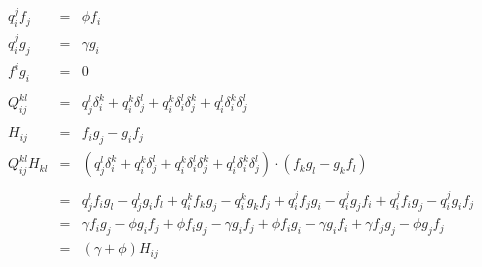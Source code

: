 \documentclass{article}
\begin{document}
\begin{eqnarray*}
  q_i^jf_j &=& \phi f_i\\
  q_i^jg_j &=& \gamma g_i\\
  f^ig_i &=& 0 \\
\\
  Q_{ij}^{kl} &=& 
        q_j^l\delta_i^k + 
        q_i^k\delta_j^l + 
        q_i^k\delta_i^l\delta_j^k +
        q_i^l\delta_i^k\delta_j^l\\
\\
  H_{ij} &=& f_ig_j - g_if_j
\\
  Q_{ij}^{kl}H_{kl} &=& 
                \left(  q_j^l\delta_i^k + 
                        q_i^k\delta_j^l + 
                        q_i^k\delta_i^l\delta_j^k +
                        q_i^l\delta_i^k\delta_j^l\right)
        \cdot  \left(f_kg_l - g_kf_l\right)\\
\\      
  &=& q_j^lf_ig_l - q_j^lg_if_l + q_i^kf_kg_j - q_i^kg_kf_j + 
      q_i^jf_jg_i - q_i^jg_jf_i + q_i^jf_ig_j - q_i^jg_if_j \\
  &=& \gamma f_ig_j - \phi g_if_j + \phi f_ig_j - \gamma g_if_j + 
      \phi f_ig_i - \gamma g_if_i + \gamma f_jg_j - \phi g_jf_j \\
  &=& \left(\gamma + \phi\right)H_{ij}
\end{eqnarray*}
\end{document}
